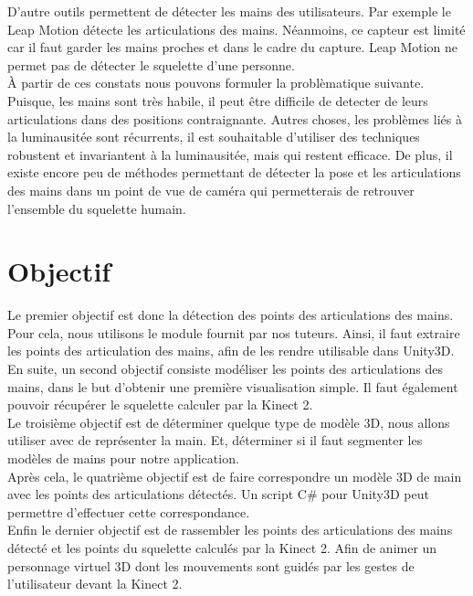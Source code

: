 D'autre outils permettent de détecter les mains des utilisateurs. Par exemple le Leap Motion détecte les articulations des mains. Néanmoins,
ce capteur est limité car il faut garder les mains proches et dans le 
cadre du capture. Leap Motion ne permet pas de détecter le squelette 
d'une personne.\\

À partir de ces constats nous pouvons formuler la problèmatique 
suivante. Puisque, 
les mains sont très habile, il peut être difficile de detecter de leurs 
articulations dans des positions contraignante. Autres choses, les 
problèmes liés à la luminausitée sont récurrents, il est souhaitable 
d'utiliser des techniques robustent et invariantent à la luminausitée, 
mais qui restent efficace. De plus, il existe encore peu de méthodes 
permettant de détecter la pose et les articulations des mains dans 
un point de vue de caméra qui permetterais de retrouver l'ensemble du
squelette humain.  

\section{Objectif}
Le premier objectif est donc la détection des points des articulations 
des mains. Pour cela, nous utilisons le module fournit par nos 
tuteurs. Ainsi, il faut extraire les points des articulation des 
mains, afin de les rendre utilisable dans Unity3D.\\

En suite, un second objectif consiste modéliser les points des 
articulations des mains, dans le but d'obtenir une première 
visualisation simple. Il faut également pouvoir récupérer le 
squelette calculer par la Kinect 2.\\

Le troisième objectif est de déterminer quelque type de modèle 3D, 
nous allons utiliser avec de représenter la main. Et, déterminer 
si il faut segmenter les modèles de mains pour notre application.\\

Après cela, le quatrième objectif est de faire correspondre un 
modèle 3D de main avec les points des articulations détectés. Un 
script C\# pour Unity3D peut permettre d'effectuer cette 
correspondance.\\

Enfin le dernier objectif est de rassembler les points des articulations 
des mains détecté et les points du squelette calculés par la Kinect 2. 
Afin de animer un personnage virtuel 3D dont les mouvements sont guidés 
par les gestes de l'utilisateur devant la Kinect 2. 

